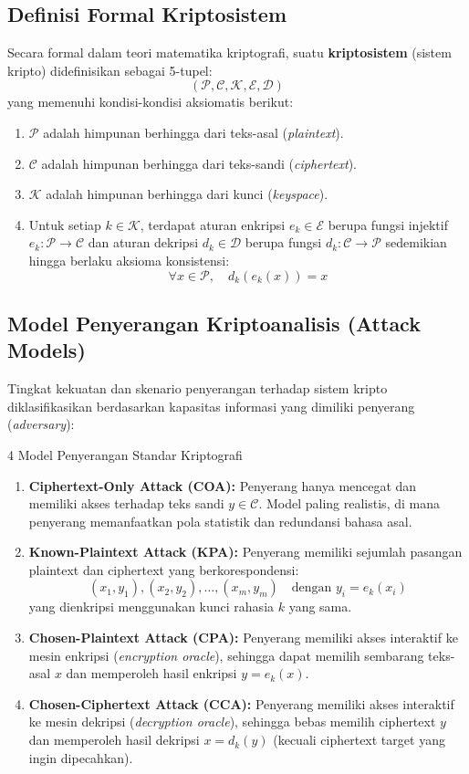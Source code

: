 \documentclass[11pt,a4paper]{article}
\begin{document}
\subsection{Definisi Formal Kriptosistem}
Secara formal dalam teori matematika kriptografi, suatu \textbf{kriptosistem} (sistem kripto) didefinisikan sebagai 5-tupel:
\[
(\mathcal{P}, \mathcal{C}, \mathcal{K}, \mathcal{E}, \mathcal{D})
\]
yang memenuhi kondisi-kondisi aksiomatis berikut:
\begin{enumerate}[leftmargin=*]
    \item $\mathcal{P}$ adalah himpunan berhingga dari teks-asal (\textit{plaintext}).
    \item $\mathcal{C}$ adalah himpunan berhingga dari teks-sandi (\textit{ciphertext}).
    \item $\mathcal{K}$ adalah himpunan berhingga dari kunci (\textit{keyspace}).
    \item Untuk setiap $k \in \mathcal{K}$, terdapat aturan enkripsi $e_k \in \mathcal{E}$ berupa fungsi injektif $e_k: \mathcal{P} \to \mathcal{C}$ dan aturan dekripsi $d_k \in \mathcal{D}$ berupa fungsi $d_k: \mathcal{C} \to \mathcal{P}$ sedemikian hingga berlaku aksioma konsistensi:
    \[
    \forall x \in \mathcal{P}, \quad d_k(e_k(x)) = x
    \]
\end{enumerate}

\subsection{Model Penyerangan Kriptoanalisis (Attack Models)}
Tingkat kekuatan dan skenario penyerangan terhadap sistem kripto diklasifikasikan berdasarkan kapasitas informasi yang dimiliki penyerang (\textit{adversary}):
\begin{teoribox}{4 Model Penyerangan Standar Kriptografi}
\begin{enumerate}[leftmargin=*]
    \item \textbf{Ciphertext-Only Attack (COA):} Penyerang hanya mencegat dan memiliki akses terhadap teks sandi $y \in \mathcal{C}$. Model paling realistis, di mana penyerang memanfaatkan pola statistik dan redundansi bahasa asal.
    \item \textbf{Known-Plaintext Attack (KPA):} Penyerang memiliki sejumlah pasangan plaintext dan ciphertext yang berkorespondensi:
    \[
    (x_1, y_1), (x_2, y_2), \dots, (x_m, y_m) \quad \text{dengan } y_i = e_k(x_i)
    \]
    yang dienkripsi menggunakan kunci rahasia $k$ yang sama.
    \item \textbf{Chosen-Plaintext Attack (CPA):} Penyerang memiliki akses interaktif ke mesin enkripsi (\textit{encryption oracle}), sehingga dapat memilih sembarang teks-asal $x$ dan memperoleh hasil enkripsi $y = e_k(x)$.
    \item \textbf{Chosen-Ciphertext Attack (CCA):} Penyerang memiliki akses interaktif ke mesin dekripsi (\textit{decryption oracle}), sehingga bebas memilih ciphertext $y$ dan memperoleh hasil dekripsi $x = d_k(y)$ (kecuali ciphertext target yang ingin dipecahkan).
\end{enumerate}
\end{teoribox}
\end{document}
